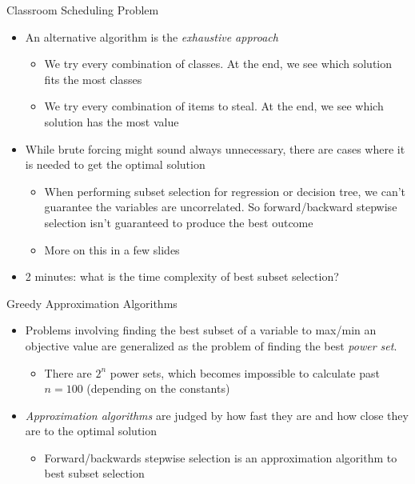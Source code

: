 \documentclass[
  ignorenonframetext,
]{beamer}
\providecommand{\tightlist}{%
  \setlength{\itemsep}{0pt}\setlength{\parskip}{0pt}}\usepackage{longtable,booktabs,array}
\begin{document}
\begin{frame}{Classroom Scheduling Problem}
\protect\hypertarget{classroom-scheduling-problem-2}{}
\begin{itemize}
\item
  An alternative algorithm is the \emph{exhaustive approach}

  \begin{itemize}
  \item
    We try every combination of classes. At the end, we see which
    solution fits the most classes
  \item
    We try every combination of items to steal. At the end, we see which
    solution has the most value
  \end{itemize}
\item
  While brute forcing might sound always unnecessary, there are cases
  where it is needed to get the optimal solution

  \begin{itemize}
  \tightlist
  \item
    When performing subset selection for regression or decision tree, we
    can't guarantee the variables are uncorrelated. So forward/backward
    stepwise selection isn't guaranteed to produce the best outcome
  \item
    More on this in a few slides
  \end{itemize}
\item
  2 minutes: what is the time complexity of best subset selection?
\end{itemize}
\end{frame}

\begin{frame}{Greedy Approximation Algorithms}
\protect\hypertarget{greedy-approximation-algorithms}{}
\begin{itemize}
\item
  Problems involving finding the best subset of a variable to max/min an
  objective value are generalized as the problem of finding the best
  \emph{power set}.

  \begin{itemize}
  \tightlist
  \item
    There are \(2^n\) power sets, which becomes impossible to calculate
    past \(n=100\) (depending on the constants)
  \end{itemize}
\item
  \emph{Approximation algorithms} are judged by how fast they are and
  how close they are to the optimal solution

  \begin{itemize}
  \tightlist
  \item
    Forward/backwards stepwise selection is an approximation algorithm
    to best subset selection
  \end{itemize}
\end{itemize}
\end{frame}
\end{document}
